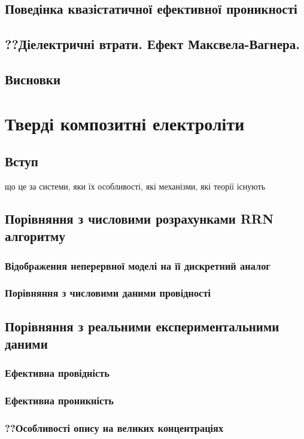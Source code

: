 \documentclass[12pt]{vakthesis}
\begin{document}
\section{Поведінка квазістатичної ефективної проникності}%
\section{??Діелектричні втрати. Ефект Максвела-Вагнера.}%
\section{Висновки}

\chapter{Тверді композитні електроліти}
\section{Вступ}
    що це за системи, яки їх особливості, які механізми,
    які теорії існують
\section{Порівняння з числовими розрахунками RRN алгоритму}
\subsection{Відображення неперервної моделі на її дискретний аналог}
\subsection{Порівняння з числовими даними провідності}
\section{Порівняння з реальними експериментальними даними}
\subsection{Ефективна провідність}
\subsection{Ефективна проникність}%
\subsection{??Особливості опису на великих концентраціях}%
\end{document}
